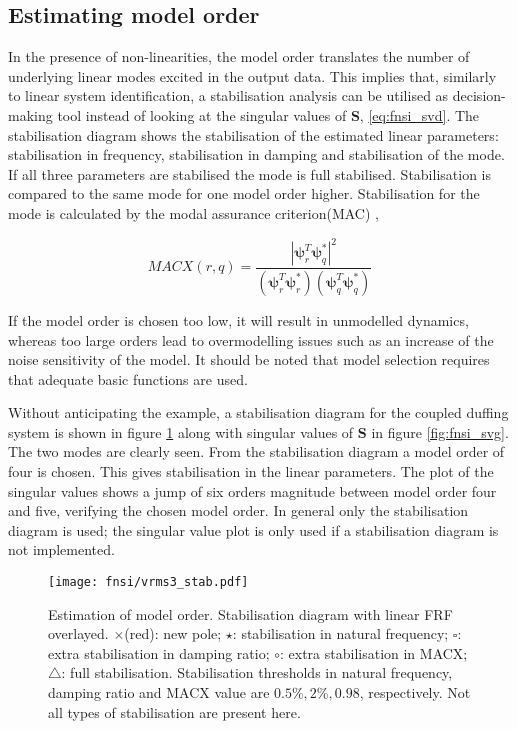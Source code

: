 \subsection{Estimating model order}

In the presence of non-linearities, the model order translates the number of
underlying linear modes excited in the output data. This implies that, similarly
to linear system identification, a stabilisation analysis can be utilised as
decision-making tool instead of looking at the singular values of $\bm S$,
\eqref{eq:fnsi_svd}. The stabilisation diagram shows the stabilisation of the
estimated linear parameters: stabilisation in frequency, stabilisation in
damping and stabilisation of the mode. If all three parameters are stabilised
the mode is full stabilised. Stabilisation is compared to the same mode for one
model order higher. Stabilisation for the mode is calculated by the modal
assurance criterion(MAC) \autocite{Allemang2003},

\begin{equation}
  MACX(r,q) = \frac{|\bm \psi^T_r \bm \psi^*_q|^2}
  {\left( \bm \psi^T_r \bm \psi^*_r \right)\left( \bm \psi^T_q \bm \psi^*_q \right)}
\end{equation}



If the model order is chosen too low, it will result in unmodelled dynamics,
whereas too large orders lead to overmodelling issues such as an increase of the
noise sensitivity of the model. It should be noted that model selection requires
that adequate basic functions are used.

Without anticipating the example, a stabilisation diagram for the coupled
duffing system is shown in figure \ref{fig:fnsi_stab} along with singular values
of $\bm S$ in figure \ref{fig:fnsi_svg}. The two modes are clearly seen.
From the stabilisation diagram a model order of four is chosen. This gives
stabilisation in the linear parameters. The plot of the singular values shows a
jump of six orders magnitude between model order four and five, verifying the
chosen model order.
In general only the stabilisation diagram is used; the singular value plot is
only used if a stabilisation diagram is not implemented.

\begin{figure}
  \centering
  \texttt{[image: fnsi/vrms3\_stab.pdf]}
  \caption{Estimation of model order. Stabilisation diagram with linear FRF overlayed.
    $\pmb\times$(red): new pole;
    $\pmb\star$: stabilisation in natural frequency;
    $\pmb\square$: extra stabilisation in damping ratio;
    $\pmb\circ$: extra stabilisation in MACX;
    $\pmb\triangle$: full stabilisation.
    Stabilisation thresholds in natural frequency, damping ratio and MACX value
    are $0.5\%, 2\%, 0.98$, respectively. Not all types of stabilisation are
    present here.
  }
  \label{fig:fnsi_stab}
\end{figure}


